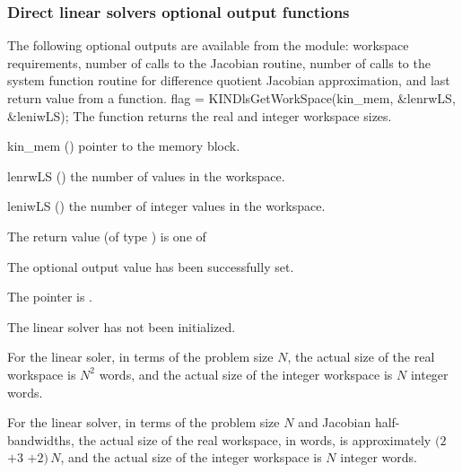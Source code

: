 
\subsubsection{Direct linear solvers optional output functions}\label{sss:optout_dense}
The following optional outputs are available from the {\kindls} module:
workspace requirements, number of calls to the Jacobian routine, number of 
calls to the system function routine for difference quotient Jacobian approximation,
and last return value from a {\kindls} function.
{
  flag = KINDlsGetWorkSpace(kin\_mem, \&lenrwLS, \&leniwLS);
}
{
  The function  returns the
  {\kindense} real and integer workspace sizes.
}
{
  \begin{args}
  \item[kin\_mem] ()
    pointer to the {\kinsol} memory block.
  \item[lenrwLS] ()
    the number of  values in the {\kindls} workspace.
  \item[leniwLS] ()
    the number of integer values in the {\kindls} workspace.
  \end{args}
}
{
  The return value  (of type ) is one of
  \begin{args}
  \item[\Id{KINDLS\_SUCCESS}] 
    The optional output value has been successfully set.
  \item[\Id{KINDLS\_MEM\_NULL}]
    The  pointer is .
  \item[\Id{KINDLS\_LMEM\_NULL}]
    The {\kindense} linear solver has not been initialized.
  \end{args}
}
{
  For the {\kindense} linear soler, in terms of the problem size $N$, 
  the actual size of the real workspace is $N^2$  words, 
  and the actual size of the integer workspace is $N$ integer words.

  For the {\kinband} linear solver, in terms of the problem size $N$ 
  and Jacobian half-bandwidths, the actual size of the real workspace, in
   words, is approximately
  $(2$ $+ 3$  $+ 2)\, N$,
  and the actual size of the integer workspace is $N$ integer words.
}
